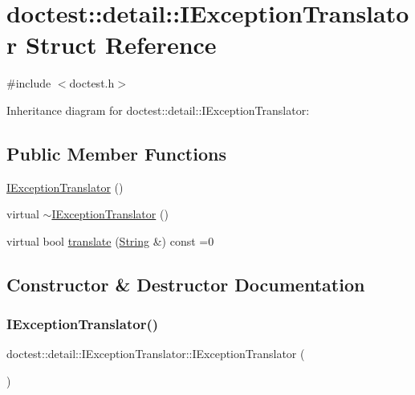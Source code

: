 \hypertarget{structdoctest_1_1detail_1_1_i_exception_translator}{}\section{doctest\+:\+:detail\+:\+:I\+Exception\+Translator Struct Reference}
\label{structdoctest_1_1detail_1_1_i_exception_translator}


{\ttfamily \#include $<$doctest.\+h$>$}



Inheritance diagram for doctest\+:\+:detail\+:\+:I\+Exception\+Translator\+:
\subsection*{Public Member Functions}
\begin{DoxyCompactItemize}
\item 
\hyperlink{structdoctest_1_1detail_1_1_i_exception_translator_a3818157edf68f08110c7212ee87ff61e}{I\+Exception\+Translator} ()
\item 
virtual \hyperlink{structdoctest_1_1detail_1_1_i_exception_translator_a9031aa45964213709841eba4b3e19d48}{$\sim$\+I\+Exception\+Translator} ()
\item 
virtual bool \hyperlink{structdoctest_1_1detail_1_1_i_exception_translator_a9c56005e4c83c13b859cc2e31102bfbc}{translate} (\hyperlink{classdoctest_1_1_string}{String} \&) const =0
\end{DoxyCompactItemize}


\subsection{Constructor \& Destructor Documentation}
\mbox{\label{structdoctest_1_1detail_1_1_i_exception_translator_a3818157edf68f08110c7212ee87ff61e}} 
\subsubsection{\texorpdfstring{I\+Exception\+Translator()}{IExceptionTranslator()}}
{\footnotesize\ttfamily doctest\+::detail\+::\+I\+Exception\+Translator\+::\+I\+Exception\+Translator (\begin{DoxyParamCaption}{ }\end{DoxyParamCaption})}


